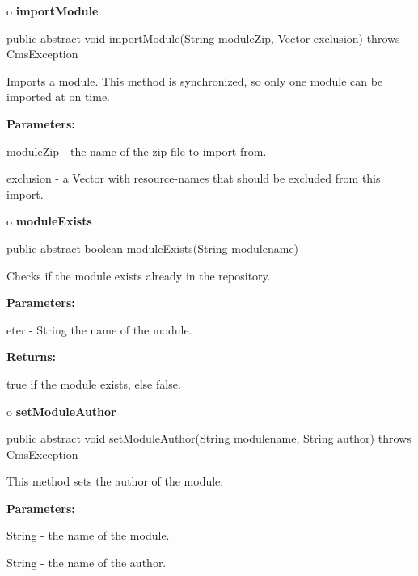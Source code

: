 o {\bf importModule} 

\begin{PRE}
 public abstract void importModule(String moduleZip,
                                   Vector exclusion) throws CmsException
\end{PRE}

\begin{description}
\htmlDD Imports a module. This method is synchronized, so only one module can
be imported at on time. 

\begin{description}
\item {\bf Parameters:}  

moduleZip - the name of the zip-file to import from.  

exclusion - a Vector with resource-names that should be excluded from this
import.  
\end{description}

\end{description}

o {\bf moduleExists} 

\begin{PRE}
 public abstract boolean moduleExists(String modulename)
\end{PRE}

\begin{description}
\htmlDD Checks if the module exists already in the repository. 

\begin{description}
\item {\bf Parameters:}  

eter - String the name of the module.  
\item {\bf Returns:}  

true if the module exists, else false.  
\end{description}

\end{description}

o {\bf setModuleAuthor} 

\begin{PRE}
 public abstract void setModuleAuthor(String modulename,
                                      String author) throws CmsException
\end{PRE}

\begin{description}
\htmlDD This method sets the author of the module. 

\begin{description}
\item {\bf Parameters:}  

String - the name of the module.  

String - the name of the author.  
\end{description}

\end{description}

